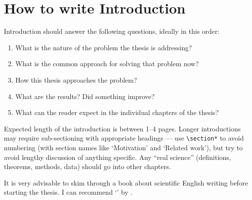 \section*{How to write Introduction}
Introduction should answer the following questions, ideally in this order:
\begin{enumerate}
\item What is the nature of the problem the thesis is addressing?
\item What is the common approach for solving that problem now?
\item How this thesis approaches the problem?
\item What are the results? Did something improve?
\item What can the reader expect in the individual chapters of the thesis?
\end{enumerate}

Expected length of the introduction is between 1--4 pages. Longer introductions may require sub-sectioning with appropriate headings --- use \texttt{\textbackslash{}section*} to avoid numbering (with section names like `Motivation' and `Related work'), but try to avoid lengthy discussion of anything specific. Any ``real science'' (definitions, theorems, methods, data) should go into other chapters.

It is very advisable to skim through a book about scientific English writing before starting the thesis. I can recommend `' by \citet{glasman2010science}.
